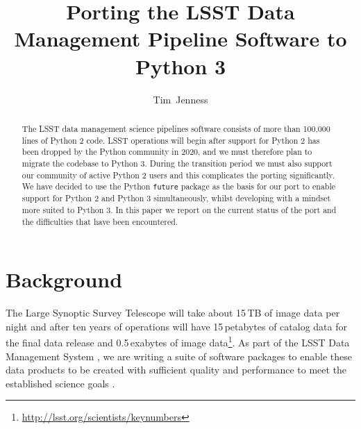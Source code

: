 \documentclass[11pt,twoside]{article}
\begin{document}
\newcommand{\arxiv}[1]{\href{http://arxiv.org/abs/#1}{\texttt{arXiv:#1}}}
\newcommand{\procspie}{Proc.\ SPIE}

\title{Porting the LSST Data Management Pipeline Software to Python 3}
\author{Tim~Jenness
}


\begin{abstract}
The LSST data management science pipelines software consists of more than 100,000 lines of Python 2 code.
LSST operations will begin after support for Python 2 has been dropped by the Python community in 2020, and we must therefore plan to migrate the codebase to Python 3.
During the transition period we must also support our community of active Python 2 users and this complicates the porting significantly.
We have decided to use the Python \texttt{future} package as the basis for our port to enable support for Python 2 and Python 3 simultaneously, whilst developing with a mindset more suited to Python 3.
In this paper we report on the current status of the port and the difficulties that have been encountered.
\end{abstract}

\section{Background}

The Large Synoptic Survey Telescope \citep[LSST;][]{2008arXiv0805.2366I} will take about 15\,TB of image data per night and after ten years of operations will have 15\,petabytes of catalog data for the final data release and 0.5\,exabytes of image data\footnote{\url{http://lsst.org/scientists/keynumbers}}.
As part of the LSST Data Management System \citep{O3-1_adassxxv}, we are writing a suite of software packages to enable these data products to be created with sufficient quality and performance to meet the established science goals \citep{2009arXiv0912.0201L}.
\end{document}
